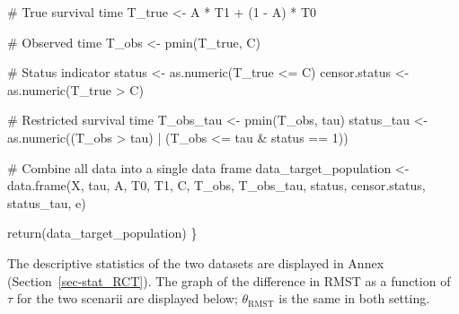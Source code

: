 \documentclass[
  11pt,
  a4paper,
]{article}
\newenvironment{Shaded}{}{}
\newcommand{\CommentTok}[1]{\textcolor[rgb]{0.42,0.45,0.49}{#1}}
\newcommand{\DecValTok}[1]{\textcolor[rgb]{0.00,0.36,0.77}{#1}}
\newcommand{\FunctionTok}[1]{\textcolor[rgb]{0.44,0.26,0.76}{#1}}
\newcommand{\NormalTok}[1]{\textcolor[rgb]{0.14,0.16,0.18}{#1}}
\newcommand{\OtherTok}[1]{\textcolor[rgb]{0.44,0.26,0.76}{#1}}
\newcommand{\SpecialCharTok}[1]{\textcolor[rgb]{0.00,0.36,0.77}{#1}}
\theoremstyle{plain}
\theoremstyle{plain}
\theoremstyle{plain}
\theoremstyle{definition}
\theoremstyle{remark}
\begin{document}
\begin{Shaded}
\begin{Highlighting}[]
  \CommentTok{\# True survival time}
\NormalTok{  T\_true }\OtherTok{\textless{}{-}}\NormalTok{ A }\SpecialCharTok{*}\NormalTok{ T1 }\SpecialCharTok{+}\NormalTok{ (}\DecValTok{1} \SpecialCharTok{{-}}\NormalTok{ A) }\SpecialCharTok{*}\NormalTok{ T0}
  
  \CommentTok{\# Observed time}
\NormalTok{  T\_obs }\OtherTok{\textless{}{-}} \FunctionTok{pmin}\NormalTok{(T\_true, C)}
  
  \CommentTok{\# Status indicator}
\NormalTok{  status }\OtherTok{\textless{}{-}} \FunctionTok{as.numeric}\NormalTok{(T\_true }\SpecialCharTok{\textless{}=}\NormalTok{ C)}
\NormalTok{  censor.status }\OtherTok{\textless{}{-}} \FunctionTok{as.numeric}\NormalTok{(T\_true }\SpecialCharTok{\textgreater{}}\NormalTok{ C)}
  
  \CommentTok{\# Restricted survival time}
\NormalTok{  T\_obs\_tau }\OtherTok{\textless{}{-}} \FunctionTok{pmin}\NormalTok{(T\_obs, tau)}
\NormalTok{  status\_tau }\OtherTok{\textless{}{-}} \FunctionTok{as.numeric}\NormalTok{((T\_obs }\SpecialCharTok{\textgreater{}}\NormalTok{ tau) }\SpecialCharTok{|}\NormalTok{ (T\_obs }\SpecialCharTok{\textless{}=}\NormalTok{ tau }\SpecialCharTok{\&}\NormalTok{ status }\SpecialCharTok{==} \DecValTok{1}\NormalTok{))}
  
  \CommentTok{\# Combine all data into a single data frame}
\NormalTok{  data\_target\_population }\OtherTok{\textless{}{-}} \FunctionTok{data.frame}\NormalTok{(X, tau, A, T0, T1, C, T\_obs, T\_obs\_tau, }
\NormalTok{                                       status, censor.status, status\_tau, e)}
  
  \FunctionTok{return}\NormalTok{(data\_target\_population)}
\NormalTok{\}}
\end{Highlighting}
\end{Shaded}

The descriptive statistics of the two datasets are displayed in Annex
(Section~\ref{sec-stat_RCT}). The graph of the difference in RMST as a
function of \(\tau\) for the two scenarii are displayed below;
\(\theta_{\mathrm{RMST}}\) is the same in both setting.
\end{document}
